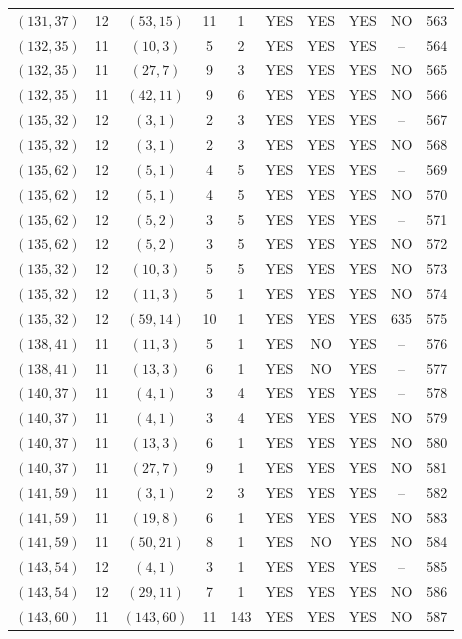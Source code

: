 \begin{longtable}{|c|c|c|c|c|c|c|c|c|c|}
$(131, 37)$ & 12 & $(53, 15)$ & 11 & 1 & YES & YES & YES & NO & 563\\
$(132, 35)$ & 11 & $(10, 3)$ & 5 & 2 & YES & YES & YES & -- & 564\\
$(132, 35)$ & 11 & $(27, 7)$ & 9 & 3 & YES & YES & YES & NO & 565\\
$(132, 35)$ & 11 & $(42, 11)$ & 9 & 6 & YES & YES & YES & NO & 566\\
$(135, 32)$ & 12 & $(3, 1)$ & 2 & 3 & YES & YES & YES & -- & 567\\
$(135, 32)$ & 12 & $(3, 1)$ & 2 & 3 & YES & YES & YES & NO & 568\\
$(135, 62)$ & 12 & $(5, 1)$ & 4 & 5 & YES & YES & YES & -- & 569\\
$(135, 62)$ & 12 & $(5, 1)$ & 4 & 5 & YES & YES & YES & NO & 570\\
$(135, 62)$ & 12 & $(5, 2)$ & 3 & 5 & YES & YES & YES & -- & 571\\
$(135, 62)$ & 12 & $(5, 2)$ & 3 & 5 & YES & YES & YES & NO & 572\\
$(135, 32)$ & 12 & $(10, 3)$ & 5 & 5 & YES & YES & YES & NO & 573\\
$(135, 32)$ & 12 & $(11, 3)$ & 5 & 1 & YES & YES & YES & NO & 574\\
$(135, 32)$ & 12 & $(59, 14)$ & 10 & 1 & YES & YES & YES & 635 & 575\\
$(138, 41)$ & 11 & $(11, 3)$ & 5 & 1 & YES & NO & YES & -- & 576\\
$(138, 41)$ & 11 & $(13, 3)$ & 6 & 1 & YES & NO & YES & -- & 577\\
$(140, 37)$ & 11 & $(4, 1)$ & 3 & 4 & YES & YES & YES & -- & 578\\
$(140, 37)$ & 11 & $(4, 1)$ & 3 & 4 & YES & YES & YES & NO & 579\\
$(140, 37)$ & 11 & $(13, 3)$ & 6 & 1 & YES & YES & YES & NO & 580\\
$(140, 37)$ & 11 & $(27, 7)$ & 9 & 1 & YES & YES & YES & NO & 581\\
$(141, 59)$ & 11 & $(3, 1)$ & 2 & 3 & YES & YES & YES & -- & 582\\
$(141, 59)$ & 11 & $(19, 8)$ & 6 & 1 & YES & YES & YES & NO & 583\\
$(141, 59)$ & 11 & $(50, 21)$ & 8 & 1 & YES & NO & YES & NO & 584\\
$(143, 54)$ & 12 & $(4, 1)$ & 3 & 1 & YES & YES & YES & -- & 585\\
$(143, 54)$ & 12 & $(29, 11)$ & 7 & 1 & YES & YES & YES & NO & 586\\
$(143, 60)$ & 11 & $(143, 60)$ & 11 & 143 & YES & YES & YES & NO & 587\\

\end{longtable}
